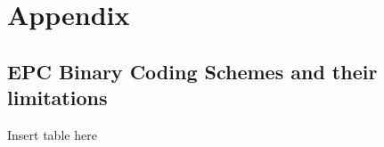 \renewcommand{\thesection}{\Alph{section}}
\chapter{Appendix} 
\begin{appendices}
\section{EPC Binary Coding Schemes and their limitations} \label{anx:epccodingschemes}
Insert table here
\end{appendices}